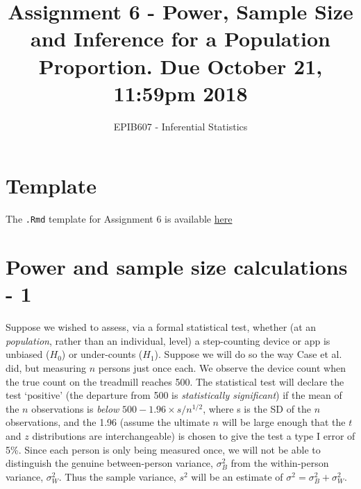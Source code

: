 \documentclass[letterpaper,9pt,twoside,printwatermark=false]{pinp}
\title{Assignment 6 - Power, Sample Size and Inference for a Population
Proportion. Due October 21, 11:59pm 2018}
\author[a]{EPIB607 - Inferential Statistics}
\affil[a]{Fall 2018, McGill University}
\begin{document}
\verticaladjustment{-2pt}

\maketitle
\thispagestyle{firststyle}



\section*{Template}\label{template}

The \texttt{.Rmd} template for Assignment 6 is available
\href{https://github.com/sahirbhatnagar/EPIB607/raw/master/assignments/a6/a6_template.Rmd}{here}

\section{Power and sample size calculations -
1}\label{power-and-sample-size-calculations---1}

Suppose we wished to assess, via a formal statistical test, whether (at
an \textit{population}, rather than an individual, level) a
step-counting device or app is unbiased (\(H_0\)) or under-counts
(\(H_1\)). Suppose we will do so the way Case et al. did, but measuring
\(n\) persons just once each. We observe the device count when the true
count on the treadmill reaches 500. The statistical test will declare
the test `positive' (the departure from 500 is
\textit{statistically significant}) if the mean of the \(n\)
observations is \textit{below} \(500 - 1.96 \times s/n^{1/2}\), where s
is the SD of the \(n\) observations, and the 1.96 (assume the ultimate
\(n\) will be large enough that the \(t\) and \(z\) distributions are
interchangeable) is chosen to give the test a type I error of 5\%. Since
each person is only being measured once, we will not be able to
distinguish the genuine between-person variance, \(\sigma^2_B\) from the
within-person variance, \(\sigma^2_W.\) Thus the sample variance,
\(s^2\) will be an estimate of \(\sigma^2 = \sigma^2_B +\sigma^2_W\).
\end{document}
